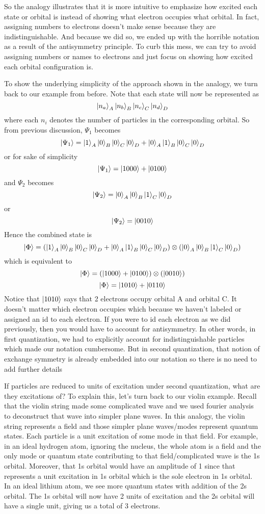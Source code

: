 \documentclass{article}
\begin{document}
So the analogy illustrates that it is more intuitive to emphasize how excited
each state or orbital is instead of showing what electron occupies what orbital.
In fact, assigning numbers to electrons doesn't make sense because they are
indistinguishable. And because we did so, we ended up with the horrible notation
as a result of the antisymmetry principle. To curb this mess, we can try to
avoid assigning numbers or names to electrons and just focus on showing
how excited each orbital configuration is.

 To show the underlying simplicity of the approach shown in the analogy,
we turn back to our example from before.
Note that each state will now be represented as
\[\ket{n_a}_A\ket{n_b}_B\ket{n_c}_C\ket{n_d}_D\]
where each \(n_i\) denotes the number of particles in the corresponding orbital.
So from previous discussion, \(\Psi_1\) becomes
\[\ket{\Psi_1} = \ket{1}_A\ket{0}_B\ket{0}_C\ket{0}_D +
\ket{0}_A\ket{1}_B\ket{0}_C\ket{0}_D\]
or for sake of simplicity
\[\ket{\Psi_1} = \ket{1000} + \ket{0100}\]
and \(\Psi_2\) becomes
\[\ket{\Psi_2} = \ket{0}_A\ket{0}_B\ket{1}_C\ket{0}_D\]
or
\[\ket{\Psi_2} = \ket{0010}\]
Hence the combined state is
\[\ket{\Phi} = (\ket{1}_A\ket{0}_B\ket{0}_C\ket{0}_D + \ket{0}_A\ket{1}_B\ket{0}_C\ket{0}_D)\otimes(\ket{0}_A\ket{0}_B\ket{1}_C\ket{0}_D) \]
which is equivalent to
\[\ket{\Phi} = (\ket{1000} + \ket{0100})\otimes(\ket{0010})\]
\[\ket{\Phi} = \ket{1010} + \ket{0110}\]
Notice that \(\ket{1010}\) says that 2 electrons occupy orbital A and orbital C.
It doesn't matter which electron occupies which because we haven't labeled
or assigned an id to each electron. If you were to id each electron as we did
previously, then you would have to account for antisymmetry. In other words,
 in first quantization, we had to explicitly account for
indistinguishable particles which made our notation cumbersome. But in
second quantization, that notion of exchange symmetry is already embedded into
our notation so there is no need to add further details

If particles are reduced to units of excitation under second quantization,
what are they excitations of? To explain this, let's turn back to our
violin example. Recall that the violin string made some complicated
wave and we used fourier analysis to deconstruct that wave into simpler
plane waves. In this analogy, the violin string represents a field and
those simpler plane waves/modes represent quantum states. Each particle
is a unit excitation of some mode in that field. For example, in an ideal
hydrogen atom, ignoring the nucleus, the whole atom is a field and the only
mode or quantum state contributing to that field/complicated wave is the 1s
orbital. Moreover, that 1s orbital would have an amplitude of 1 since that
represents a unit excitation in 1s orbital which is the sole electron in
1s orbital. In an ideal lithium atom, we see more quantum states with addition of the
2s orbital. The 1s orbital will now have 2 units of excitation and the 2s orbital
will have a single unit, giving us a total of 3 electrons.
\end{document}
